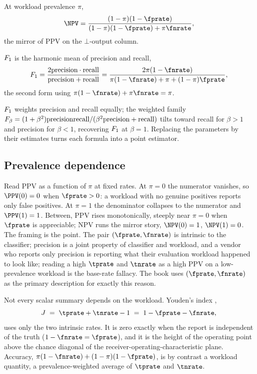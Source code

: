 \begin{definition}
\label{def:npv}
At workload prevalence $\pi$,
\[
  \NPV = \frac{(1 - \pi)(1 - \fprate)}{(1 - \pi)(1 - \fprate) + \pi\fnrate},
\]
the mirror of PPV on the $\bot$-output column.
\end{definition}

\begin{definition}
\label{def:f1}
$F_1$ is the harmonic mean of precision and recall,
\[
  \Fone = \frac{2\Precision \cdot \Recall}{\Precision + \Recall}
        = \frac{2\pi(1 - \fnrate)}{\pi(1 - \fnrate) + \pi + (1 - \pi)\fprate},
\]
the second form using $\pi(1 - \fnrate) + \pi\fnrate = \pi$.
\end{definition}

\noindent $F_1$ weights precision and recall equally; the weighted family
$F_\beta = (1 + \beta^2)\mathrm{precision}\mathrm{recall}/(\beta^2\mathrm{precision} + \mathrm{recall})$
tilts toward recall for $\beta > 1$ and precision for $\beta < 1$, recovering
$F_1$ at $\beta = 1$. Replacing the parameters by their estimates turns each
formula into a point estimator.

\subsection*{Prevalence dependence}

Read PPV as a function of $\pi$ at fixed rates. At $\pi = 0$ the numerator
vanishes, so $\PPV(0) = 0$ when $\fprate > 0$: a workload with no genuine
positives reports only false positives. At $\pi = 1$ the denominator collapses
to the numerator and $\PPV(1) = 1$. Between, PPV rises monotonically, steeply
near $\pi = 0$ when $\fprate$ is appreciable; NPV runs the mirror story,
$\NPV(0) = 1$, $\NPV(1) = 0$. The framing is the point. The pair $(\fprate,
\fnrate)$ is intrinsic to the classifier; precision is a joint property of
classifier and workload, and a vendor who reports only precision is reporting
what their evaluation workload happened to look like; reading a high
$\tprate$ and $\tnrate$ as a high PPV on a low-prevalence workload is the
base-rate fallacy. The book uses $(\fprate,
\fnrate)$ as the primary description for exactly this reason.

Not every scalar summary depends on the workload. Youden's index
\parencite{youden-1950},
\[
  J \;=\; \tprate + \tnrate - 1 \;=\; 1 - \fprate - \fnrate,
\]
uses only the two intrinsic rates. It is zero
exactly when the report is independent of the truth ($1 - \fnrate =
\fprate$), and it is the height of the operating point above the chance
diagonal of the receiver-operating-characteristic plane. Accuracy,
$\pi(1 - \fnrate) + (1 - \pi)(1 - \fprate)$, is by contrast a workload
quantity, a prevalence-weighted average of $\tprate$ and $\tnrate$.

